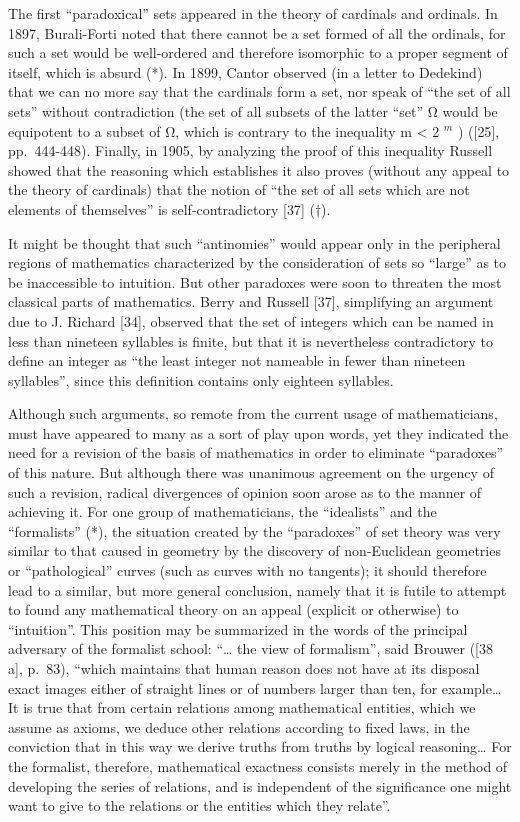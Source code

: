 The first ``paradoxical'' sets appeared in the theory of cardinals and ordinals. In 1897, Burali-Forti noted that there cannot be a set formed of all the ordinals, for such a set would be well-ordered and therefore isomorphic to a proper segment of itself, which is absurd (*). In 1899, Cantor observed (in a letter to Dedekind) that we can no more say that the cardinals form a set, nor speak of ``the set of all sets'' without contradiction (the set of all subsets of the latter ``set'' Ω would be equipotent to a subset of Ω, which is contrary to the inequality m \textless{} 2 \(^{m}\) ) ({[}25{]}, pp.~444-448). Finally, in 1905, by analyzing the proof of this inequality Russell showed that the reasoning which establishes it also proves (without any appeal to the theory of cardinals) that the notion of ``the set of all sets which are not elements of themselves'' is self-contradictory {[}37{]} (†).

It might be thought that such ``antinomies'' would appear only in the peripheral regions of mathematics characterized by the consideration of sets so ``large'' as to be inaccessible to intuition. But other paradoxes were soon to threaten the most classical parts of mathematics. Berry and Russell {[}37{]}, simplifying an argument due to J. Richard {[}34{]}, observed that the set of integers which can be named in less than nineteen syllables is finite, but that it is nevertheless contradictory to define an integer as ``the least integer not nameable in fewer than nineteen syllables'', since this definition contains only eighteen syllables.

Although such arguments, so remote from the current usage of mathematicians, must have appeared to many as a sort of play upon words, yet they indicated the need for a revision of the basis of mathematics in order to eliminate ``paradoxes'' of this nature. But although there was unanimous agreement on the urgency of such a revision, radical divergences of opinion soon arose as to the manner of achieving it. For one group of mathematicians, the ``idealists'' and the ``formalists'' (*), the situation created by the ``paradoxes'' of set theory was very similar to that caused in geometry by the discovery of non-Euclidean geometries or ``pathological'' curves (such as curves with no tangents); it should therefore lead to a similar, but more general conclusion, namely that it is futile to attempt to found any mathematical theory on an appeal (explicit or otherwise) to ``intuition''. This position may be summarized in the words of the principal adversary of the formalist school: ``\ldots{} the view of formalism'', said Brouwer ({[}38 a{]}, p.~83), ``which maintains that human reason does not have at its disposal exact images either of straight lines or of numbers larger than ten, for example\ldots{} It is true that from certain relations among mathematical entities, which we assume as axioms, we deduce other relations according to fixed laws, in the conviction that in this way we derive truths from truths by logical reasoning\ldots{} For the formalist, therefore, mathematical exactness consists merely in the method of developing the series of relations, and is independent of the significance one might want to give to the relations or the entities which they relate''.

